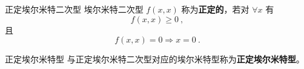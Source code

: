 \begin{definition}{正定埃尔米特二次型}
埃尔米特二次型 $f(   x,   x)$ 称为\textbf{正定的}，若对 $\forall    x$ 有
\begin{equation}
f(   x,   x)\geq0~,
\end{equation}
且
\begin{equation}
f(   x,   x)=0\Rightarrow   x=   0~.
\end{equation}
\end{definition}
\begin{definition}{正定埃尔米特型}\label{def_HeFor_1}
与正定埃尔米特二次型对应的埃尔米特型称为\textbf{正定埃尔米特型}。
\end{definition}
